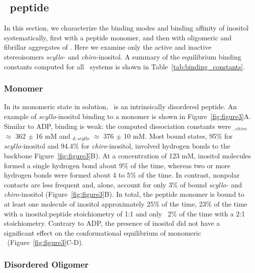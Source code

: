 \subsection{\gafour\ peptide}
In this section, we characterize the binding modes and binding affinity of inositol systematically, first with a peptide monomer, and then with oligomeric and fibrillar aggregates of \gafour. Here we examine only the active and inactive stereoisomers \textit{scyllo-} and \textit{chiro-}inositol. A summary of the equilibrium binding constants computed for all \gafour\ systems is shown in Table~\ref{tab:binding_constants}.

\subsubsection{Monomer}
In its monomeric state in solution, \gafour\ is an intrinsically disordered peptide.\cite{Nikolic:2011p57} An example of \textit{scyllo-}inositol binding to a monomer is shown in Figure~\ref{fig:figure3}A. Similar to ADP, binding is weak: the computed dissociation constants were \KD$_{,chiro}$  $\approx$ 362 $\pm$ 16 mM and \KD$_{d,scyllo}$  $\approx$ 376 $\pm$ 10 mM. Most bound states, 95\% for \textit{scyllo-}inositol and 94.4\% for \textit{chiro-}inositol, involved hydrogen bonds to the backbone Figure~\ref{fig:figure3}B). At a concentration of 123 mM, inositol molecules formed a single hydrogen bond about 9\% of the time, whereas two or more hydrogen bonds were formed about 4 to 5\% of the time. In contrast, nonpolar contacts are less frequent and, alone, account for only 3\% of bound \textit{scyllo-} and \textit{chiro-}inositol (Figure~\ref{fig:figure3}B). In total, the peptide monomer is bound to at least one molecule of inositol approximately 25\% of the time, 23\% of the time with a inositol:peptide stoichiometry of 1:1 and only ~2\% of the time with a 2:1 stoichiometry. Contrary to ADP, the presence of inositol did not have a significant effect on the conformational equilibrium of monomeric \gafour\ (Figure~\ref{fig:figure3}C-D).

\subsubsection{Disordered Oligomer}

